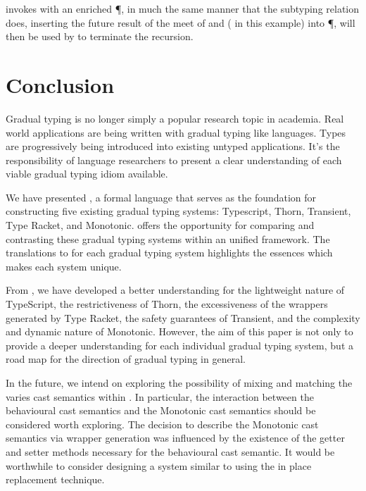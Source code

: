 \documentclass[a4paper,USenglish]{tex/lipics-v2016}
\begin{document}
 invokes  with an enriched \P, in much the same manner
that the subtyping relation does, inserting the future result of the meet of
 and  ( in this example) into \P, will then
be used by  to terminate the recursion.

\section{Conclusion}

Gradual typing is no longer simply a popular research topic in academia.
Real world applications are being written with gradual typing like languages.
Types are progressively being introduced into existing untyped applications.
It's the responsibility of language researchers to present a clear understanding 
of each viable gradual typing idiom available.

We have presented \kafka, a formal language that serves as the foundation for 
constructing five existing gradual typing systems: Typescript, Thorn, Transient, 
Type Racket, and Monotonic. \kafka offers the opportunity for comparing and 
contrasting these gradual typing systems within an unified framework. The translations
to \kafka for each gradual typing system highlights the essences which makes each system unique.

From \kafka, we have developed a better understanding for the lightweight nature of TypeScript,
the restrictiveness of Thorn, the excessiveness of the wrappers generated by Type Racket,
the safety guarantees of Transient, and the complexity and dynamic nature of Monotonic.
However, the aim of this paper is not only to provide a deeper understanding for each
individual gradual typing system, but a road map for the direction of gradual typing in general.

In the future, we intend on exploring the possibility of mixing and matching the varies 
cast semantics within \kafka. In particular, the interaction between the behavioural cast semantics 
and the Monotonic cast semantics should be considered worth exploring.
The decision to describe the Monotonic cast semantics via wrapper generation was influenced
by the existence of the getter and setter methods necessary for the behavioural cast semantic.
It would be worthwhile to consider designing a system similar to \kafka using the in place 
replacement technique. 


\clearpage



\end{document}
